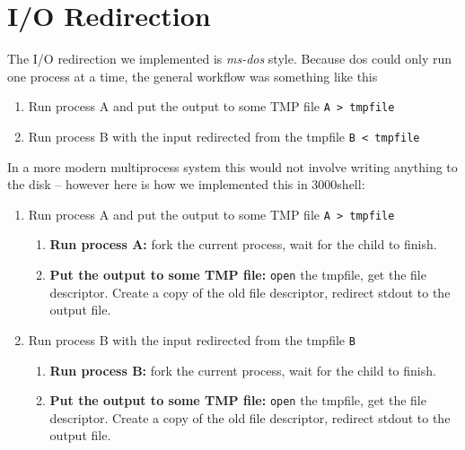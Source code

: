 
\section{I/O Redirection}

The I/O redirection we implemented is \textit{ms-dos} style. Because dos could
only run one process at a time, the general workflow was something like this

\begin{enumerate}
\item Run process A and put the output to some TMP file \texttt{A > tmpfile}
\item Run process B with the input redirected from the tmpfile \texttt{B < tmpfile}
\end{enumerate}

In a more modern multiprocess system this would not involve writing anything to
the disk -- however here is how we implemented this in 3000shell:

\begin{enumerate}
\item Run process A and put the output to some TMP file \texttt{A > tmpfile}
  \begin{enumerate}
  \item \textbf{Run process A:} fork the current process, wait for the child to
    finish.
  \item \textbf{Put the output to some TMP file:} \texttt{open} the tmpfile, get
    the file descriptor. Create a copy of the old file descriptor, redirect stdout
    to the output file.
  \end{enumerate}
\item Run process B with the input redirected from the tmpfile \texttt{B}
    \begin{enumerate}
    \item \textbf{Run process B:} fork the current process, wait for the child to
    finish.
  \item \textbf{Put the output to some TMP file:} \texttt{open} the tmpfile, get
    the file descriptor. Create a copy of the old file descriptor, redirect stdout
    to the output file.
  \end{enumerate}
\end{enumerate}

